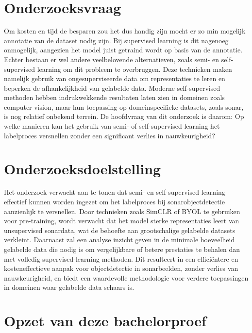 \section{Onderzoeksvraag}%
\label{sec:onderzoeksvraag}

Om kosten en tijd de besparen zou het dus handig zijn mocht er zo min mogelijk annotatie van de dataset nodig zijn. Bij supervised learning is dit nagenoeg onmogelijk, aangezien het model juist getraind wordt op basis van de annotatie. Echter bestaan er wel andere veelbelovende alternatieven, zoals semi- en self-supervised learning om dit probleem te overbruggen. Deze technieken maken namelijk gebruik van ongesuperviseerde data om representaties te leren en beperken de afhankelijkheid van gelabelde data. Moderne self-supervised methoden hebben indrukwekkende resultaten laten zien in domeinen zoals computer vision, maar hun toepassing op domeinspecifieke datasets, zoals sonar, is nog relatief onbekend terrein. De hoofdvraag van dit onderzoek is daarom: Op welke manieren kan het gebruik van semi- of self-supervised learning het labelproces versnellen zonder een significant verlies in nauwkeurigheid?

\section{Onderzoeksdoelstelling}%
\label{sec:onderzoeksdoelstelling}

Het onderzoek verwacht aan te tonen dat semi- en self-supervised learning effectief kunnen worden ingezet om het labelproces bij sonarobjectdetectie aanzienlijk te versnellen. Door technieken zoals SimCLR of BYOL te gebruiken voor pre-training, wordt verwacht dat het model sterke representaties leert van unsupervised sonardata, wat de behoefte aan grootschalige gelabelde datasets verkleint. Daarnaast zal een analyse inzicht geven in de minimale hoeveelheid gelabelde data die nodig is om vergelijkbare of betere prestaties te behalen dan met volledig supervised-learning methoden. Dit resulteert in een efficiëntere en kosteneffectieve aanpak voor objectdetectie in sonarbeelden, zonder verlies van nauwkeurigheid, en biedt een waardevolle methodologie voor verdere toepassingen in domeinen waar gelabelde data schaars is.

\section{Opzet van deze bachelorproef}%
\label{sec:opzet-bachelorproef}

